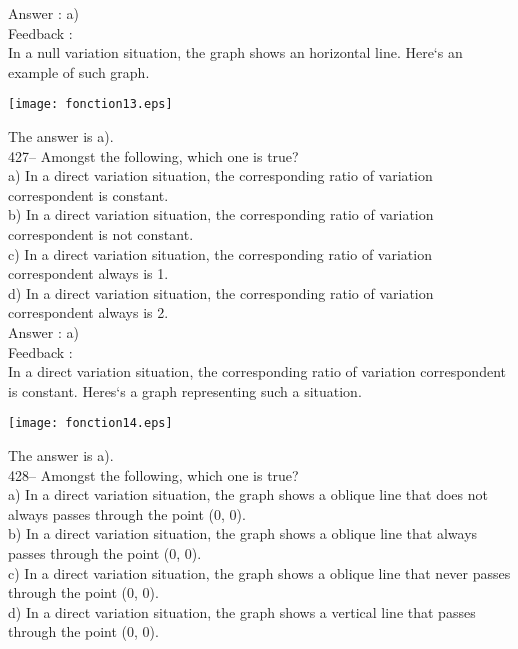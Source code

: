 \documentclass[letterpaper, 12pt]{article}
\begin{document}
Answer :  a)\\

Feedback : \\
In a null variation situation, the graph shows an horizontal line.
Here`s an example of such graph.\\
    \begin{center}
    \texttt{[image: fonction13.eps]}
    \end{center}

The answer is a).\\

427-- Amongst the following, which one is true?\\
a) In a direct variation situation, the corresponding ratio of variation
correspondent is constant.\\
b) In a direct variation situation, the corresponding ratio of variation
correspondent is not constant.\\
c) In a direct variation situation, the corresponding ratio of variation
correspondent always is 1.\\
d) In a direct variation situation, the corresponding ratio of variation
correspondent always is 2.\\

Answer :  a)\\

Feedback : \\
In a direct variation situation, the corresponding ratio of variation
correspondent is constant.
Heres`s a graph representing such a situation.\\
    \begin{center}
    \texttt{[image: fonction14.eps]}
    \end{center}

The answer is a).\\

428-- Amongst the following, which one is true?\\
a) In a direct variation situation, the graph shows a
oblique line that does not always passes through the point (0, 0).\\
b) In a direct variation situation, the graph shows a
oblique line that always passes through the point (0, 0).\\
c) In a direct variation situation, the graph shows a
oblique line that never passes through the point (0, 0).\\
d) In a direct variation situation, the graph shows a
vertical line that passes through the point (0, 0).\\
\end{document}
